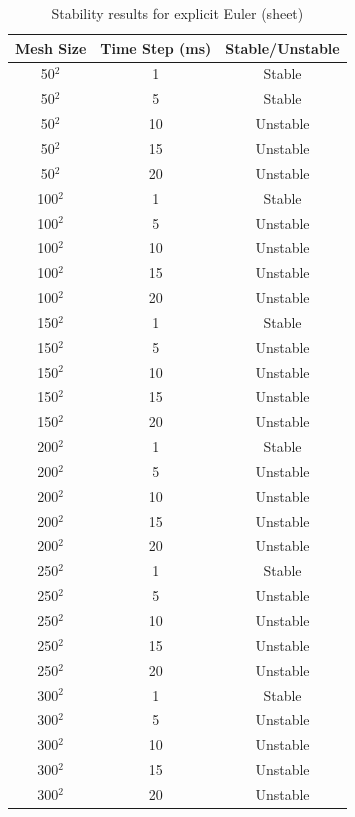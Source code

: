 \begin{table}[tp]
   \begin{minipage}{\textwidth}
      \begin{center}
         \begin{tabular}{|c|c|c|} \hline
           Mesh Size & Time Step (ms) & Stable/Unstable\\
           \hline
           50$^{2}$ & 1 & Stable\\ \hline
           50$^{2}$ & 5 & Stable\\ \hline
           50$^{2}$ & 10 & Unstable\\ \hline
           50$^{2}$ & 15 & Unstable\\ \hline
           50$^{2}$ & 20 & Unstable\\ \hline
           100$^{2}$ & 1 & Stable\\ \hline
           100$^{2}$ & 5 & Unstable\\ \hline
           100$^{2}$ & 10 & Unstable\\ \hline
           100$^{2}$ & 15 & Unstable\\ \hline
           100$^{2}$ & 20 & Unstable\\ \hline           
           150$^{2}$ & 1 & Stable\\ \hline
           150$^{2}$ & 5 & Unstable\\ \hline
           150$^{2}$ & 10 & Unstable\\ \hline
           150$^{2}$ & 15 & Unstable\\ \hline
           150$^{2}$ & 20 & Unstable\\ \hline           
           200$^{2}$ & 1 & Stable\\ \hline
           200$^{2}$ & 5 & Unstable\\ \hline
           200$^{2}$ & 10 & Unstable\\ \hline
           200$^{2}$ & 15 & Unstable\\ \hline
           200$^{2}$ & 20 & Unstable\\ \hline           
           250$^{2}$ & 1 & Stable\\ \hline
           250$^{2}$ & 5 & Unstable\\ \hline
           250$^{2}$ & 10 & Unstable\\ \hline
           250$^{2}$ & 15 & Unstable\\ \hline
           250$^{2}$ & 20 & Unstable\\ \hline           
           300$^{2}$ & 1 & Stable\\ \hline
           300$^{2}$ & 5 & Unstable\\ \hline
           300$^{2}$ & 10 & Unstable\\ \hline
           300$^{2}$ & 15 & Unstable\\ \hline
           300$^{2}$ & 20 & Unstable\\ \hline
         \end{tabular}
      \end{center}
   \end{minipage}
   \caption{Stability results for explicit Euler (sheet)}
   \label{tab:ee stability sheet}
\end{table}

